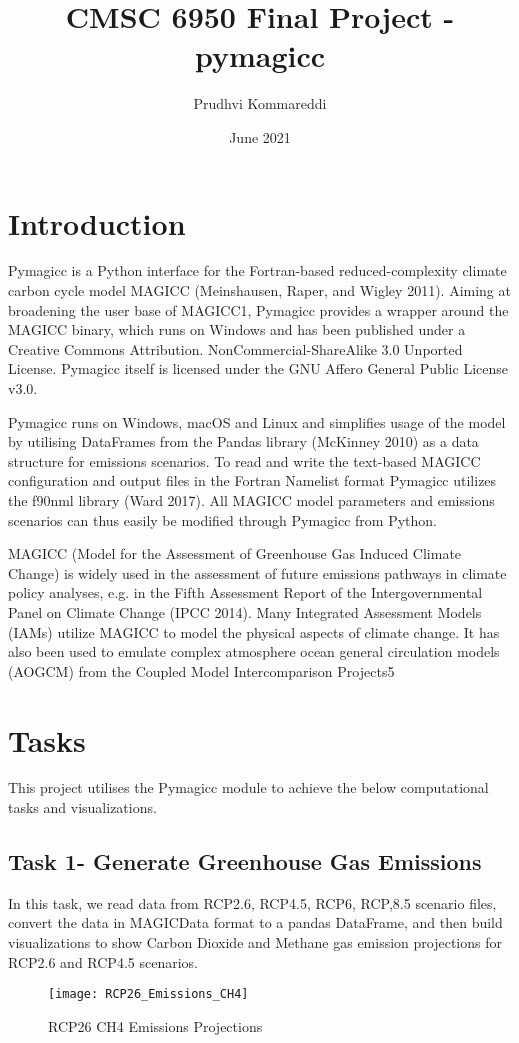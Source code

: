 \documentclass{article}
\title{CMSC 6950 Final Project - pymagicc}
\author{Prudhvi Kommareddi}
\date{June 2021}
\begin{document}
\maketitle

\section{Introduction}
Pymagicc\cite{Gieseke2018} is a Python interface for the Fortran-based reduced-complexity climate carbon cycle model MAGICC (Meinshausen, Raper, and Wigley 2011). Aiming at broadening the user base of MAGICC1, Pymagicc provides a wrapper around the MAGICC binary, which runs on Windows and has been published under a Creative Commons Attribution. NonCommercial-ShareAlike 3.0 Unported License. Pymagicc itself is licensed under the GNU Affero General Public License v3.0.

Pymagicc runs on Windows, macOS and Linux and simplifies usage of the model by utilising DataFrames from the Pandas library (McKinney 2010) as a data structure for emissions scenarios. To read and write the text-based MAGICC configuration and output files in the Fortran Namelist format Pymagicc utilizes the f90nml library (Ward 2017). All MAGICC model parameters and emissions scenarios can thus easily be modified through Pymagicc from Python.

MAGICC (Model for the Assessment of Greenhouse Gas Induced Climate Change) is widely used in the assessment of future emissions pathways in climate policy analyses, e.g. in the Fifth Assessment Report of the Intergovernmental Panel on Climate Change (IPCC 2014). Many Integrated Assessment Models (IAMs) utilize MAGICC to model the physical aspects of climate change. It has also been used to emulate complex atmosphere ocean general circulation models (AOGCM) from the Coupled Model Intercomparison Projects5


\section{Tasks}
This project utilises the Pymagicc module to achieve the below computational tasks and visualizations.

\subsection{Task 1- Generate Greenhouse Gas Emissions}
In this task, we read data from RCP2.6, RCP4.5, RCP6, RCP,8.5 scenario files, convert the data in MAGICData format to a pandas DataFrame, and then build visualizations to show Carbon Dioxide and Methane gas emission projections for RCP2.6 and RCP4.5 scenarios. 
\begin{figure}[ht]
    \texttt{[image: RCP26\_Emissions\_CH4]}
    \caption{RCP26 CH4 Emissions Projections}
\end{figure}
\end{document}
